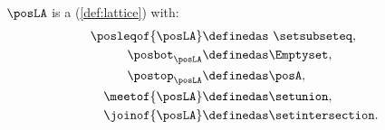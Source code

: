 \begin{lemma}
    $\posLA$ is a  (\cref{def:lattice}) with:
    \begin{equation}
        \begin{aligned}
            \posleqof{\posLA} & \definedas \ \setsubseteq, \\
            \posbot_{\posLA}  & \definedas \Emptyset, \\
            \postop_{\posLA}  & \definedas \posA, \\
            \meetof{\posLA}   & \definedas \setunion, \\
            \joinof{\posLA}   & \definedas \setintersection.
        \end{aligned}
    \end{equation}
\end{lemma}
